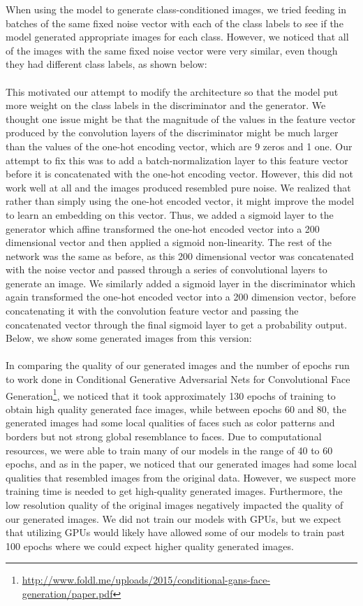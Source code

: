 \documentclass[a4paper]{article}
\begin{document}
When using the model to generate class-conditioned images, we tried feeding in batches of the same fixed noise vector with each of the class labels to see if the model generated appropriate images for each class. However, we noticed that all of the images with the same fixed noise vector were very similar, even though they had different class labels, as shown below:
\\\\
This motivated our attempt to modify the architecture so that the model put more weight on the class labels in the discriminator and the generator. We thought one issue might be that the magnitude of the values in the feature vector produced by the convolution layers of the discriminator might be much larger than the values of the one-hot encoding vector, which are 9 zeros and 1 one. Our attempt to fix this was to add a batch-normalization layer to this feature vector before it is concatenated with the one-hot encoding vector. However, this did not work well at all and the images produced resembled pure noise. We realized that rather than simply using the one-hot encoded vector, it might improve the model to learn an embedding on this vector. Thus, we added a sigmoid layer to the generator which affine transformed the one-hot encoded vector into a 200 dimensional vector and then applied a sigmoid non-linearity. The rest of the network was the same as before, as this 200 dimensional vector was concatenated with the noise vector and passed through a series of convolutional layers to generate an image. We similarly added a sigmoid layer in the discriminator which again transformed the one-hot encoded vector into a 200 dimension vector, before concatenating it with the convolution feature vector and passing the concatenated vector through the final sigmoid layer to get a probability output. Below, we show some generated images from this version:
\\\\
In comparing the quality of our generated images and the number of epochs run to work done in Conditional Generative Adversarial Nets for Convolutional Face Generation\footnote{\url{http://www.foldl.me/uploads/2015/conditional-gans-face-generation/paper.pdf}}, we noticed that it took approximately 130 epochs of training to obtain high quality generated face images, while between epochs 60 and 80, the generated images had some local qualities of faces such as color patterns and borders but not strong global resemblance to faces. Due to computational resources, we were able to train many of our models in the range of 40 to 60 epochs, and as in the paper, we noticed that our generated images had some local qualities that resembled images from the original data. However, we suspect more training time is needed to get high-quality generated images. Furthermore, the low resolution quality of the original images negatively impacted the quality of our generated images. We did not train our models with GPUs, but we expect that utilizing GPUs would likely have allowed some of our models to train past 100 epochs where we could expect higher quality generated images. 
\end{document}
